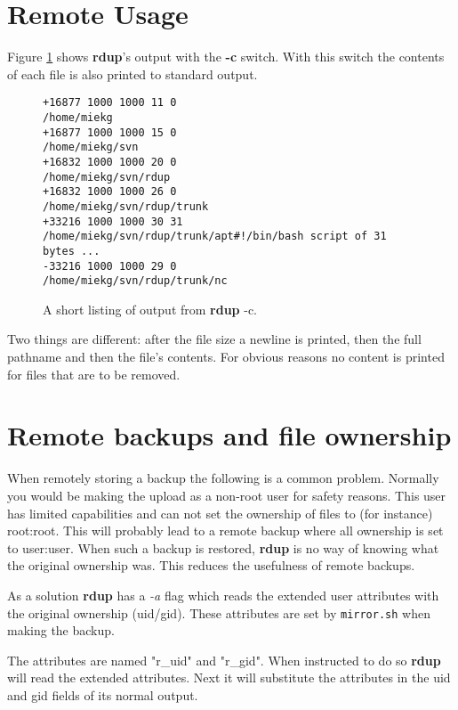 \documentclass[a4paper, openany]{blocksbook}
\newcommand{\rdup}{\textbf{rdup}}
\newcommand{\cmd}[1]{\texttt{#1}}
\newcommand{\flag}[1]{\textit{#1}}
\begin{document}
\section{Remote Usage}
Figure \ref{fig:rdup -c output} shows \rdup's output with the
\textbf{-c} switch. With this switch the contents of each file is also
printed to standard output.

\begin{figure}[hbt]
\begin{verbatim}
+16877 1000 1000 11 0 
/home/miekg
+16877 1000 1000 15 0 
/home/miekg/svn
+16832 1000 1000 20 0 
/home/miekg/svn/rdup
+16832 1000 1000 26 0 
/home/miekg/svn/rdup/trunk
+33216 1000 1000 30 31 
/home/miekg/svn/rdup/trunk/apt#!/bin/bash script of 31 bytes ...
-33216 1000 1000 29 0 
/home/miekg/svn/rdup/trunk/nc
\end{verbatim}
\caption{A short listing of output from \rdup{} -c.}
\label{fig:rdup -c output}
\end{figure}

Two things are different: after the file size a newline is printed, then
the full pathname and then the file's contents.  For obvious reasons no
content is printed for files that are to be removed.

\section{Remote backups and file ownership}
When remotely storing a backup the following is a common problem.
Normally you would be making the upload as a non-root user for safety
reasons. This user has limited capabilities and can not set the ownership
of files to (for instance) root:root. This will probably lead to a
remote backup where all ownership is set to user:user. When such a
backup is restored, \rdup{} is no way of knowing what the original
ownership was. This reduces the usefulness of remote backups.

As a solution \rdup{} has a \flag{-a} flag which reads the
extended user attributes with the original ownership (uid/gid).
These attributes are set by \cmd{mirror.sh} when making the backup.

The attributes are named "r\_uid" and "r\_gid". When instructed to
do so \rdup{} will read the extended attributes. Next it will 
substitute the attributes in the uid and gid fields of its
normal output.
\end{document}

